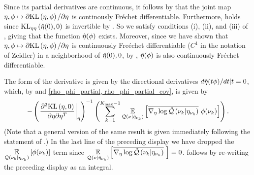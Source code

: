 Since its partial derivatives are continuous, it follows by \citet[Proposition
4.14(c)]{zeidler:2013:functional} that the joint map $\eta, \phi \mapsto
\partial \mathrm{KL}\left(\eta, \phi\right) / \partial \eta$ is continously Fr{\'e}chet
differentiable.  Furthermore, \citet[Chapter 4 Condition
21b]{zeidler:2013:functional} holds since $\mathrm{KL}_{\eta\eta}\left(\hat\eta(0), 0\right)$ is
invertible by .   So we satisfy conditions (i),
(ii), and (iii) of \citet[Theorem 4.B(c)]{zeidler:2013:functional}, giving that
the function $\hat\eta(\phi)$ exists.  Moreover, since we have shown that $\eta,
\phi \mapsto \partial \mathrm{KL}\left(\eta, \phi\right) / \partial \eta$ is continuously
Fre{\'e}chet differentiable ($C^1$ in the notation of Zeidler) in a neighborhood
of $\hat\eta(0), 0$, by \citet[Theorem 4.B(d)]{zeidler:2013:functional},
$\hat\eta(\phi)$ is also continuously Fr{\'e}chet differentiable.

The form of the derivative is given by the directional derivatives $d \hat\eta(t
\phi) / dt | t = 0$, which, by  and \eqref{rho_phi_partial,
rho_phi_partial_cov}, is given by
%
\begin{align*}
%
-\left(\fracat{\partial^2 \KL{\eta, \phiz}}
                {\partial \eta \partial \eta^T}
                {\etaopt}\right)^{-1}
\left(
    \sumkm \expect{\q(\nu \vert \etaoptnuk)}
                  {\lqgradbar{\nuk \vert \etanuk}
                   \phi(\nuk) }
\right).
%
\end{align*}
%
(Note that a general version of the same result is given immediately following
the statement of \citet[Theorem 4.B(c)]{zeidler:2013:functional}.)  In the last
line of the preceding display we have dropped the $\underset{\mathcal{Q}(\nu_{k} \vert
\eta_{\nu_{k}})}{\mathbb{E}}\left[\phi(\nu_{k})\right]$ term since $\underset{\mathcal{Q}(\nu \vert \hat\eta_{\nu_{k}})}{\mathbb{E}}\left[\overline{{\nabla_\eta \log \tilde{\mathcal{Q}}}\left(\nu_{k} \vert \eta_{\nu_{k}}\right)}\,\,\right] = 0$.   follows by
re-writing the preceding display as an integral.
%
